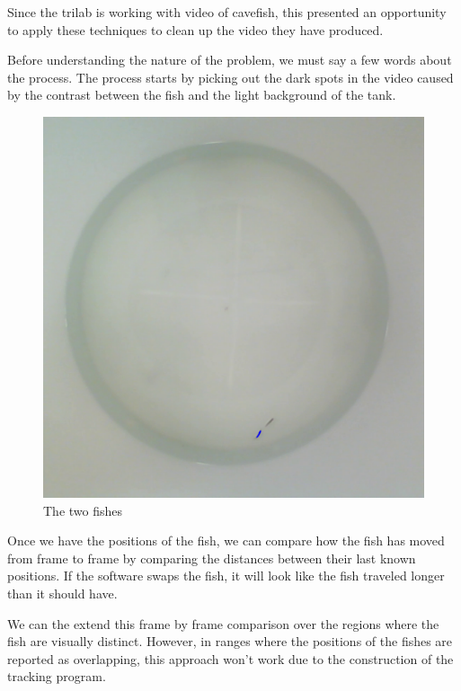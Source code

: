 \documentclass{article}
\begin{document}
Since the trilab is working with video of cavefish, this presented an opportunity to apply these techniques to clean up the video they have produced.

Before understanding the nature of the problem, we must say a few words about the process. The process starts by picking out the dark spots in the video caused by the contrast between the fish and the light background of the tank.

\begin{figure}[H]
	\centering
	\includegraphics[width=.5\linewidth]{fish}
	\caption{The two fishes}
	\label{fig:fish}
\end{figure}

Once we have the positions of the fish, we can compare how the fish has moved from frame to frame by comparing the distances between their last known positions. If the software swaps the fish, it will look like the fish traveled longer than it should have.

We can the extend this frame by frame comparison over the regions where the fish are visually distinct. However, in ranges where the positions of the fishes are reported as overlapping, this approach won't work due to the construction of the tracking program. 
\end{document}

